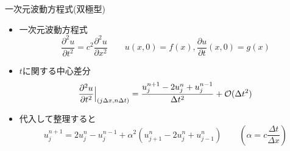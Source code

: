 \begin{frame}[t]{一次元波動方程式(双極型)}
  \begin{itemize}
  \item 一次元波動方程式
    \[
    \frac{\partial^2 u}{\partial t^2} = c^2 \frac{\partial^2 u}{\partial x^2} \qquad u(x,0)=f(x), \frac{\partial u}{\partial t} (x,0) = g(x)
    \]
  \item $t$に関する中心差分
    \[
    \frac{\partial^2 u}{\partial t^2} \Big|_{(j \Delta x, n \Delta t)} = \frac{u_{j}^{n+1} - 2 u_{j}^{n} + u_{j}^{n-1}}{\Delta t^2} + {\cal O}(\Delta t^2)
    \]
  \item 代入して整理すると
    \[
    u_{j}^{n+1} = 2u_{j}^{n} - u_{j}^{n-1} + \alpha^2 (u_{j+1}^{n} - 2 u_{j}^{n} + u_{j-1}^{n}) \qquad (\alpha = c\frac{\Delta t}{\Delta x})
    \]
  \end{itemize}
\end{frame}
